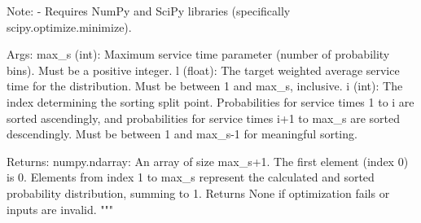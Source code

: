 \documentclass[
  letterpaper,
  DIV=11,
  numbers=noendperiod]{scrartcl}
\newenvironment{Shaded}{\begin{snugshade}}{\end{snugshade}}
\newcommand{\CommentTok}[1]{\textcolor[rgb]{0.37,0.37,0.37}{#1}}
\begin{document}
\begin{Shaded}
\begin{Highlighting}[]
\CommentTok{    Note:}
\CommentTok{        {-} Requires NumPy and SciPy libraries (specifically scipy.optimize.minimize).}

\CommentTok{    Args:}
\CommentTok{        max\_s (int): Maximum service time parameter (number of probability bins).}
\CommentTok{                     Must be a positive integer.}
\CommentTok{        l (float): The target weighted average service time for the distribution.}
\CommentTok{                   Must be between 1 and max\_s, inclusive.}
\CommentTok{        i (int): The index determining the sorting split point. Probabilities}
\CommentTok{                 for service times 1 to \textquotesingle{}i\textquotesingle{} are sorted ascendingly, and}
\CommentTok{                 probabilities for service times \textquotesingle{}i+1\textquotesingle{} to \textquotesingle{}max\_s\textquotesingle{} are sorted}
\CommentTok{                 descendingly. Must be between 1 and max\_s{-}1 for meaningful sorting.}

\CommentTok{    Returns:}
\CommentTok{        numpy.ndarray: An array of size max\_s+1. The first element (index 0) is 0.}
\CommentTok{                       Elements from index 1 to max\_s represent the calculated}
\CommentTok{                       and sorted probability distribution, summing to 1.}
\CommentTok{                       Returns None if optimization fails or inputs are invalid.}
\CommentTok{    """}


\end{Highlighting}
\end{Shaded}
\end{document}
